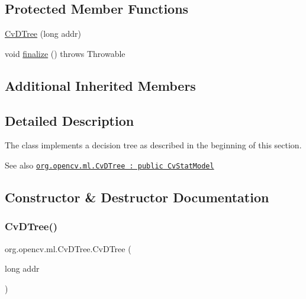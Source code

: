 \subsection*{Protected Member Functions}
\begin{DoxyCompactItemize}
\item 
\mbox{\hyperlink{classorg_1_1opencv_1_1ml_1_1_cv_d_tree_af4d2ee92fbbff7d3cd696a797a9ae712}{Cv\+D\+Tree}} (long addr)
\item 
void \mbox{\hyperlink{classorg_1_1opencv_1_1ml_1_1_cv_d_tree_a21b34c07e27e61d50a4c53584d3fed76}{finalize}} ()  throws Throwable 
\end{DoxyCompactItemize}
\subsection*{Additional Inherited Members}


\subsection{Detailed Description}
The class implements a decision tree as described in the beginning of this section.

\begin{DoxySeeAlso}{See also}
\href{http://docs.opencv.org/modules/ml/doc/decision_trees.html#cvdtree}{\tt org.\+opencv.\+ml.\+Cv\+D\+Tree \+: public Cv\+Stat\+Model} 
\end{DoxySeeAlso}


\subsection{Constructor \& Destructor Documentation}
\mbox{\label{classorg_1_1opencv_1_1ml_1_1_cv_d_tree_af4d2ee92fbbff7d3cd696a797a9ae712}} 
\subsubsection{\texorpdfstring{Cv\+D\+Tree()}{CvDTree()}\hspace{0.1cm}{\footnotesize\ttfamily [1/2]}}
{\footnotesize\ttfamily org.\+opencv.\+ml.\+Cv\+D\+Tree.\+Cv\+D\+Tree (\begin{DoxyParamCaption}\item[{long}]{addr }\end{DoxyParamCaption})\hspace{0.3cm}{\ttfamily [protected]}}

